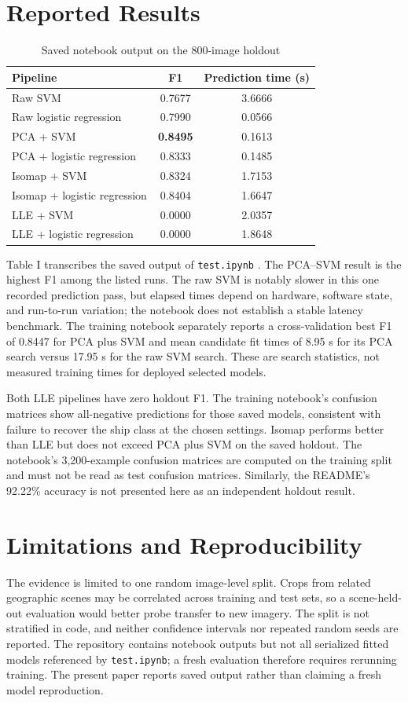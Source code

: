 \documentclass[conference]{IEEEtran}
\begin{document}
\section{Reported Results}
\begin{table}[ht]
\caption{Saved notebook output on the 800-image holdout}
\centering
\begin{tabular}{lcc}
\hline
Pipeline & F1 & Prediction time (s) \\
\hline
Raw SVM & 0.7677 & 3.6666 \\
Raw logistic regression & 0.7990 & 0.0566 \\
PCA + SVM & \textbf{0.8495} & 0.1613 \\
PCA + logistic regression & 0.8333 & 0.1485 \\
Isomap + SVM & 0.8324 & 1.7153 \\
Isomap + logistic regression & 0.8404 & 1.6647 \\
LLE + SVM & 0.0000 & 2.0357 \\
LLE + logistic regression & 0.0000 & 1.8648 \\
\hline
\end{tabular}
\end{table}
Table I transcribes the saved output of \texttt{test.ipynb} \cite{repo}. The PCA--SVM result is the highest F1 among the listed runs. The raw SVM is notably slower in this one recorded prediction pass, but elapsed times depend on hardware, software state, and run-to-run variation; the notebook does not establish a stable latency benchmark. The training notebook separately reports a cross-validation best F1 of 0.8447 for PCA plus SVM and mean candidate fit times of 8.95 s for its PCA search versus 17.95 s for the raw SVM search. These are search statistics, not measured training times for deployed selected models.

Both LLE pipelines have zero holdout F1. The training notebook's confusion matrices show all-negative predictions for those saved models, consistent with failure to recover the ship class at the chosen settings. Isomap performs better than LLE but does not exceed PCA plus SVM on the saved holdout. The notebook's 3,200-example confusion matrices are computed on the training split and must not be read as test confusion matrices. Similarly, the README's 92.22\% accuracy is not presented here as an independent holdout result.

\balance
\section{Limitations and Reproducibility}
The evidence is limited to one random image-level split. Crops from related geographic scenes may be correlated across training and test sets, so a scene-held-out evaluation would better probe transfer to new imagery. The split is not stratified in code, and neither confidence intervals nor repeated random seeds are reported. The repository contains notebook outputs but not all serialized fitted models referenced by \texttt{test.ipynb}; a fresh evaluation therefore requires rerunning training. The present paper reports saved output rather than claiming a fresh model reproduction.
\end{document}
